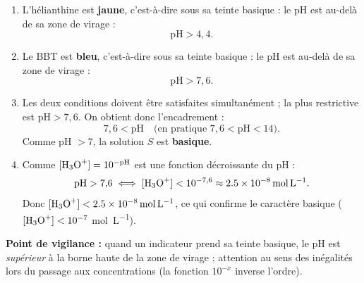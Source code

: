 \documentclass[11pt]{article}
\begin{document}
\begin{corrige}
\begin{enumerate}
\item L'hélianthine est \textbf{jaune}, c'est-à-dire sous sa teinte basique : le pH est au-delà de sa zone de virage :
\[ \mathrm{pH} > 4{,}4. \]
\item Le BBT est \textbf{bleu}, c'est-à-dire sous sa teinte basique : le pH est au-delà de sa zone de virage :
\[ \mathrm{pH} > 7{,}6. \]
\item Les deux conditions doivent être satisfaites simultanément ; la plus restrictive est $\mathrm{pH} > 7{,}6$. On obtient donc l'encadrement :
\[ \boxed{7{,}6 < \mathrm{pH}} \quad \text{(en pratique } 7{,}6 < \mathrm{pH} < 14 \text{)}. \]
Comme pH $> 7$, la solution $S$ est \textbf{basique}.
\item Comme $[\ce{H3O+}] = 10^{-\mathrm{pH}}$ est une fonction décroissante du pH :
\[ \mathrm{pH} > 7{,}6 \iff [\ce{H3O+}] < 10^{-7{,}6} \approx \SI{2,5e-8}{mol.L^{-1}}. \]
Donc $[\ce{H3O+}] < \SI{2,5e-8}{mol.L^{-1}}$, ce qui confirme le caractère basique ($[\ce{H3O+}] < 10^{-7}$ \si{mol.L^{-1}}).
\end{enumerate}
\textbf{Point de vigilance :} quand un indicateur prend sa teinte basique, le pH est \emph{supérieur} à la borne haute de la zone de virage ; attention au sens des inégalités lors du passage aux concentrations (la fonction $10^{-x}$ inverse l'ordre).
\end{corrige}
\end{document}
